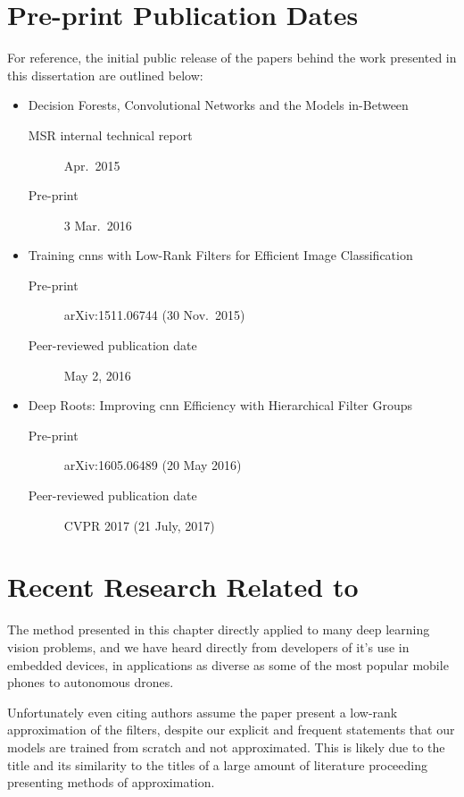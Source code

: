 \documentclass[thesis]{subfiles}
\begin{document}
\section{Pre-print Publication Dates}
For reference, the initial public release of the papers behind the work presented in this dissertation are outlined below:
\begin{itemize}
    \item Decision Forests, Convolutional Networks and the Models in-Between~\citep{Ioannou2015}
    \begin{description}
        \item[MSR internal technical report] Apr.\, 2015
        \item[Pre-print] 3 Mar.\ 2016
    \end{description}
    \item Training \glspl{cnn} with Low-Rank Filters for Efficient Image Classification~\citep{Ioannou2016}
    \begin{description}
        \item[Pre-print] arXiv:1511.06744 (30 Nov.\ 2015)
        \item[Peer-reviewed publication date] May 2, 2016
    \end{description}
    \item Deep Roots: Improving \gls{cnn} Efficiency with Hierarchical Filter Groups~\citep{ioannou2016e}
    \begin{description}
        \item[Pre-print] arXiv:1605.06489 (20 May 2016)
        \item[Peer-reviewed publication date] CVPR 2017 (21 July, 2017)
    \end{description}
\end{itemize}

\section{Recent Research Related to }
The method presented in this chapter directly applied to many deep learning vision problems, and we have heard directly from developers of it's use in embedded devices, in applications as diverse as some of the most popular mobile phones to autonomous drones.

Unfortunately even citing authors assume the paper present a low-rank approximation of the filters, despite our explicit and frequent statements that our models are trained from scratch and not approximated. This is likely due to the title and its similarity to the titles of a large amount of literature proceeding presenting methods of approximation.
\end{document}
